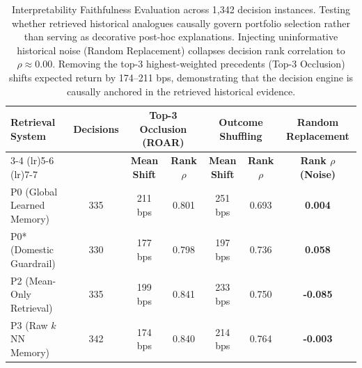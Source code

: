 \begin{table}[ht]
\centering
\small
\begin{tabular}{lcccccc}
\toprule
\textbf{Retrieval System} & \textbf{Decisions} & \multicolumn{2}{c}{\textbf{Top-3 Occlusion (ROAR)}} & \multicolumn{2}{c}{\textbf{Outcome Shuffling}} & \textbf{Random Replacement} \\
\cmidrule(lr){3-4} \cmidrule(lr){5-6} \cmidrule(lr){7-7}
& & \textbf{Mean Shift} & \textbf{Rank $\rho$} & \textbf{Mean Shift} & \textbf{Rank $\rho$} & \textbf{Rank $\rho$ (Noise)} \\
\midrule
P0 (Global Learned Memory) & 335 & 211 bps & 0.801 & 251 bps & 0.693 & \textbf{0.004} \\
P0* (Domestic Guardrail) & 330 & 177 bps & 0.798 & 197 bps & 0.736 & \textbf{0.058} \\
P2 (Mean-Only Retrieval) & 335 & 199 bps & 0.841 & 233 bps & 0.750 & \textbf{-0.085} \\
P3 (Raw $k$NN Memory) & 342 & 174 bps & 0.840 & 214 bps & 0.764 & \textbf{-0.003} \\
\bottomrule
\end{tabular}
\caption{Interpretability Faithfulness Evaluation across 1,342 decision instances. Testing whether retrieved historical analogues causally govern portfolio selection rather than serving as decorative post-hoc explanations. Injecting uninformative historical noise (Random Replacement) collapses decision rank correlation to $\rho \approx 0.00$. Removing the top-3 highest-weighted precedents (Top-3 Occlusion) shifts expected return by 174--211 bps, demonstrating that the decision engine is causally anchored in the retrieved historical evidence.}
\label{tab:interpretability_faithfulness}
\end{table}
